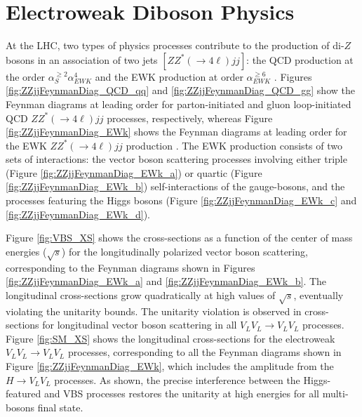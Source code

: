 \section{ Electroweak Diboson Physics } 
\label{sec:EWKPheno}

At the LHC, two types of physics processes contribute to the production of di-$Z$ bosons in an association of two jets $[ ZZ^*( \rightarrow 4\ell) jj ]$: the QCD production at the order $\alpha_{S}^{\geq 2} \alpha_{EWK}^{4}$ and the EWK production at order $\alpha_{EWK}^{\geq6}$ \cite{CMSRun2ZZjj}. Figures \ref{fig:ZZjjFeynmanDiag_QCD_qq} and \ref{fig:ZZjjFeynmanDiag_QCD_gg} show the Feynman diagrams at leading order for parton-initiated and gluon loop-initiated QCD $ZZ^*(\rightarrow 4\ell) jj$ processes, respectively, whereas Figure \ref{fig:ZZjjFeynmanDiag_EWk} shows the Feynman diagrams at leading order for the EWK $ZZ^*(\rightarrow 4\ell) jj$ production \cite{PowhegV2ZZjj}. The EWK production consists of two sets of interactions: the vector boson scattering processes involving either triple (Figure \ref{fig:ZZjjFeynmanDiag_EWk_a}) or quartic (Figure \ref{fig:ZZjjFeynmanDiag_EWk_b}) self-interactions of the gauge-bosons, and the processes featuring the Higgs bosons (Figure \ref{fig:ZZjjFeynmanDiag_EWk_c} and \ref{fig:ZZjjFeynmanDiag_EWk_d}). 

Figure \ref{fig:VBS_XS} shows the cross-sections as a function of the center of mass energies ($\sqrt{s}$) for the longitudinally polarized vector boson scattering, corresponding to the Feynman diagrams shown in Figures \ref{fig:ZZjjFeynmanDiag_EWk_a} and \ref{fig:ZZjjFeynmanDiag_EWk_b}. The longitudinal cross-sections grow quadratically at high values of $\sqrt{s}$, eventually violating the unitarity bounds. The unitarity violation is observed in cross-sections for longitudinal vector boson scattering in all $V_L V_L \rightarrow V_L V_L$ processes. Figure \ref{fig:SM_XS} shows the longitudinal cross-sections for the electroweak $V_L V_L \rightarrow V_L V_L$ processes, corresponding to all the Feynman diagrams shown in Figure \ref{fig:ZZjjFeynmanDiag_EWk}, which includes the amplitude from the $H\rightarrow V_L V_L$ processes. As shown, the precise interference between the Higgs-featured and VBS processes restores the unitarity at high energies for all multi-bosons final state\cite{VBSWWWW}.

